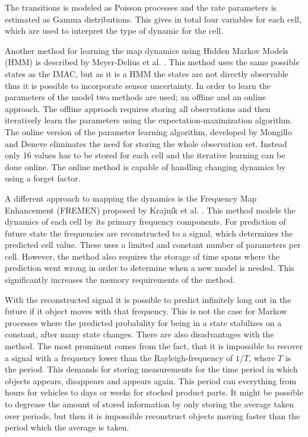 The transitions is modeled as Poisson processes and the rate parameters is estimated as Gamma distributions. This gives in total four variables for each cell, which are used to interpret the type of dynamic for the cell. 

Another method for learning the map dynamics using Hidden Markov Models (HMM) is described by Meyer-Delius et al. \cite{Meyer-Delius2012}. This method uses the same possible states as the IMAC, but as it is a HMM the states are not directly observable thus it is possible to incorporate sensor uncertainty. In order to learn the parameters of the model two methods are used; an offline and an online approach. The offline approach requires storing all observations and then iteratively learn the parameters using the expectation-maximization algorithm. The online version of the parameter learning algorithm, developed by Mongillo and Deneve \cite{Mongillo2008} eliminates the need for storing the whole observation set. Instead only 16 values has to be stored for each cell and the iterative learning can be done online. The online method is capable of handling changing dynamics by using a forget factor. 

A different approach to mapping the dynamics is the Frequency Map Enhancement (FREMEN) proposed by Krajník et al. \cite{Krajnik2014}. This method models the dynamics of each cell by its primary frequency components. 
For prediction of future state the frequencies are reconstructed to a signal, which determines the predicted cell value. 
These uses a limited and constant number of parameters per cell. However, the method also requires the storage of time spans where the prediction went wrong in order to determine when a new model is needed. This significantly increases the memory requirements of the method.

With the reconstructed signal it is possible to predict infinitely long out in the future if it object moves with that frequency. 
This is not the case for Markow processes where the predicted probability for being in a state stabilizes on a constant, after many state changes.
There are also disadvantages with the method.
The most prominent comes from the fact, that it is impossible to recover a signal with a frequency lower than the Rayleigh-frequency of $1/T$, where $T$ is the period. 
This demands for storing measurements for the time period in which objects appears, disappears and appears again. This period can everything from hours for vehicles to days or weeks for stocked product parts. 
It might be possible to degrease the amount of stored information by only storing the average taken over periods, but then it is impossible reconstruct objects moving faster than the period which the average is taken. 

